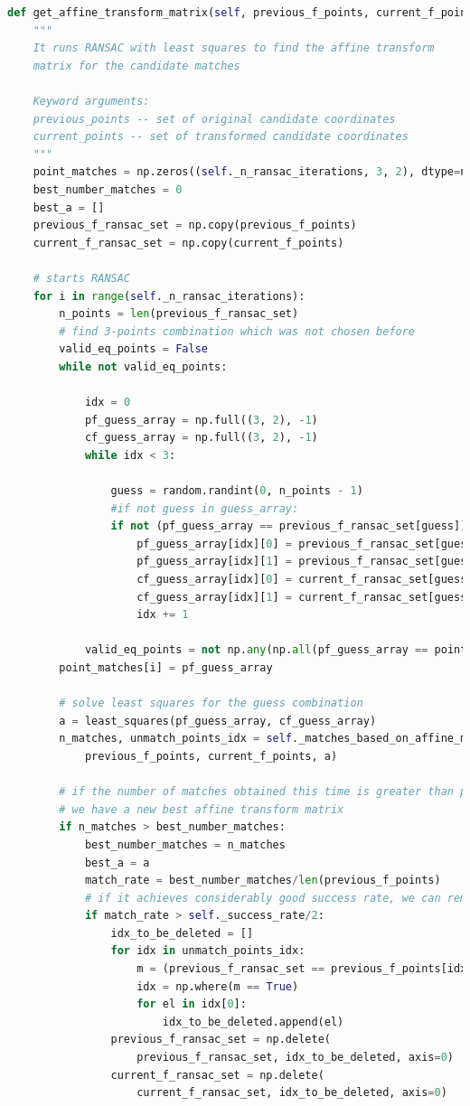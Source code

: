 \documentclass[]{IEEEtran}
\begin{document}
\begin{lstlisting}[language=Python, caption={RANSAC to estimate Affine Transformation Matrix}, label={code:ransac}]
  def get_affine_transform_matrix(self, previous_f_points, current_f_points):
    """
    It runs RANSAC with least squares to find the affine transform
    matrix for the candidate matches

    Keyword arguments:
    previous_points -- set of original candidate coordinates
    current_points -- set of transformed candidate coordinates
    """
    point_matches = np.zeros((self._n_ransac_iterations, 3, 2), dtype=np.float32)
    best_number_matches = 0
    best_a = []
    previous_f_ransac_set = np.copy(previous_f_points)
    current_f_ransac_set = np.copy(current_f_points)

    # starts RANSAC
    for i in range(self._n_ransac_iterations):
        n_points = len(previous_f_ransac_set)
        # find 3-points combination which was not chosen before
        valid_eq_points = False
        while not valid_eq_points:

            idx = 0
            pf_guess_array = np.full((3, 2), -1)
            cf_guess_array = np.full((3, 2), -1)
            while idx < 3:

                guess = random.randint(0, n_points - 1)
                #if not guess in guess_array:
                if not (pf_guess_array == previous_f_ransac_set[guess]).all(1).any():
                    pf_guess_array[idx][0] = previous_f_ransac_set[guess][0]
                    pf_guess_array[idx][1] = previous_f_ransac_set[guess][1]
                    cf_guess_array[idx][0] = current_f_ransac_set[guess][0]
                    cf_guess_array[idx][1] = current_f_ransac_set[guess][1]
                    idx += 1

            valid_eq_points = not np.any(np.all(pf_guess_array == point_matches, axis=(1, 2)))
        point_matches[i] = pf_guess_array

        # solve least squares for the guess combination
        a = least_squares(pf_guess_array, cf_guess_array)
        n_matches, unmatch_points_idx = self._matches_based_on_affine_matrix(
            previous_f_points, current_f_points, a)

        # if the number of matches obtained this time is greater than previous iterations, 
        # we have a new best affine transform matrix
        if n_matches > best_number_matches:
            best_number_matches = n_matches
            best_a = a
            match_rate = best_number_matches/len(previous_f_points)
            # if it achieves considerably good success rate, we can remove outlier candidates
            if match_rate > self._success_rate/2:
                idx_to_be_deleted = []
                for idx in unmatch_points_idx:
                    m = (previous_f_ransac_set == previous_f_points[idx]).all(1)
                    idx = np.where(m == True)
                    for el in idx[0]:
                        idx_to_be_deleted.append(el)
                previous_f_ransac_set = np.delete(
                    previous_f_ransac_set, idx_to_be_deleted, axis=0)
                current_f_ransac_set = np.delete(
                    current_f_ransac_set, idx_to_be_deleted, axis=0)


\end{lstlisting}
\end{document}
